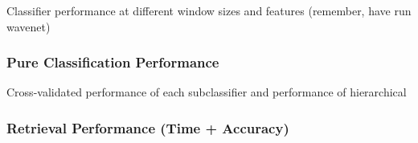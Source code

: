 Classifier performance at different window sizes and features (remember, have run wavenet)

\subsubsection{Pure Classification Performance}

Cross-validated performance of each subclassifier and performance of hierarchical

\subsubsection{Retrieval Performance (Time + Accuracy)}




